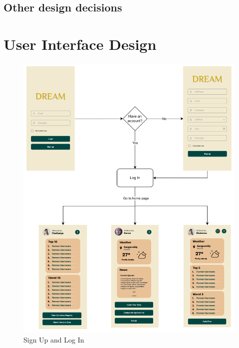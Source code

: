 \documentclass[table, 12pt]{article}
\begin{document}
\subsection{Other design decisions}
\newpage
\section{User Interface Design}
\begin{center}
    \begin{figure}[H]
        \includegraphics[scale=0.74, center]{assets/MockUp/SignUpandLogin.png}
        \caption{Sign Up and Log In}
        \label{fig: signMockup}
    \end{figure}
\end{center}
\end{document}
